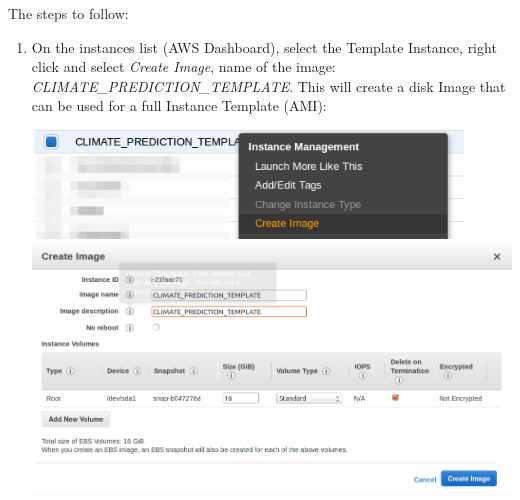 \documentclass[journal abbreviation, manuscript]{copernicus}
\begin{document}
The steps to follow:
\begin{enumerate}
 \item On the instances list (AWS Dashboard), select the Template Instance, right click and select \textit{Create Image},
 name of the image: \textit{CLIMATE\_PREDICTION\_TEMPLATE}. This will create a disk Image that can be used for a full Instance Template (AMI):
\begin{center}
  \includegraphics[width=4.5in]{images/screenshots/image_creation/01.png} \\
  \includegraphics[width=6.5in]{images/screenshots/image_creation/02.png}
\end{center}


\end{enumerate}
\end{document}
